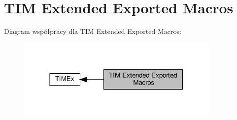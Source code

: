 \hypertarget{group___t_i_m_ex___exported___macros}{}\section{T\+IM Extended Exported Macros}
\label{group___t_i_m_ex___exported___macros}
Diagram współpracy dla T\+IM Extended Exported Macros\+:\nopagebreak
\begin{figure}[H]
\begin{center}
\leavevmode
\includegraphics[width=282pt]{group___t_i_m_ex___exported___macros}
\end{center}
\end{figure}
